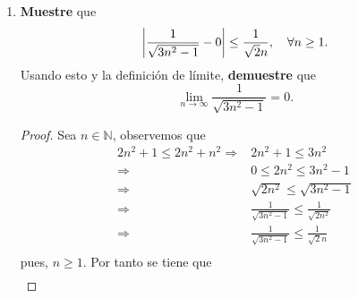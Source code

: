 \documentclass[12pt]{article}
\begin{document}
\begin{enumerate}
\begin{proof}
        De (II): Sea $\varepsilon>0$. Por la propiedad arquimediana existe $N\in\mathbb{N}$ ($N>1$) tal que $0<\frac{1}{N-1}\leq\varepsilon^2\Rightarrow \frac{1}{\sqrt{N-1}}\leq\varepsilon$. Por tanto, si $n\geq N$, entonces $\sqrt{n-1}\geq\sqrt{N-1}\Rightarrow \frac{1}{\sqrt{n-1}}\leq\frac{1}{\sqrt{N-1}}$. Luego:
        \begin{equation*}
            \begin{split}
                \abs{\frac{1}{\sqrt{n-1}}-0}=&\frac{1}{\sqrt{n-1}}\\
                \leq&\frac{1}{\sqrt{N-1}}\\
                <&\varepsilon
            \end{split}
        \end{equation*}
        Por tanto, de la definición de límite se sigue que $\lim_{n\rightarrow\infty}\frac{1}{\sqrt{n-1}}=0$.
        \qed
    \end{proof}
    \item \textbf{Muestre} que
        \begin{equation*}
            \left| \frac{1}{\sqrt{3n^2-1}}-0 \right|\leq \frac{1}{\sqrt{2}n},\quad \forall n\geq1.
        \end{equation*}
        Usando esto y la definición de límite, \textbf{demuestre} que
        \begin{equation*}
            \lim_{n\rightarrow \infty}\frac{1}{\sqrt{3n^2-1}}=0.
        \end{equation*}
    \begin{proof}
        Sea $n\in\mathbb{N}$, observemos que
        \begin{equation*}
            \begin{split}
                2n^2+1\leq2n^2+n^2\Rightarrow& 2n^2+1\leq3n^2\\
                \Rightarrow& 0\leq2n^2\leq3n^2-1\\
                \Rightarrow& \sqrt{2n^2}\leq\sqrt{3n^2-1}\\
                \Rightarrow& \frac{1}{\sqrt{3n^2-1}}\leq\frac{1}{\sqrt{2n^2}}\\
                \Rightarrow& \frac{1}{\sqrt{3n^2-1}}\leq\frac{1}{\sqrt{2}n}\\
            \end{split}
        \end{equation*}
        pues, $n\geq1$. Por tanto se tiene que
        \begin{equation*}
            \begin{split}

\end{split}
\end{equation*}
\end{proof}
\end{enumerate}
\end{document}
